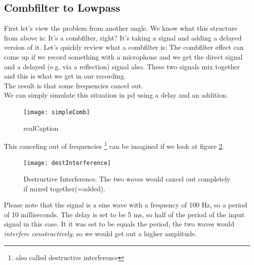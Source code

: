 \subsection{Combfilter to Lowpass}
First let's view the problem from another angle. We know what this structure from above is: It's a combfilter, right? It's taking a signal and adding a delayed version of it. Let's quickly review what a combfilter is:
The combfilter effect can come up if we record something with a microphone and we get the direct signal and a delayed (e.g. via a reflection) signal also. These two signals mix together and this is what we get in our recording.\\
The result is that some frequencies cancel out.\\
We can simply simulate this situation in pd using a delay and an addition.

\begin{figure}[H]
	\centering
	\texttt{[image: simpleComb]}
	\caption[shortCaption]
	{realCaption}
	\label{fig:label}
\end{figure}

This canceling out of frequencies \footnote{also called destructive interference} can be imagined if we look at figure \ref{fig:destIntereference}.
\begin{figure}[H]
	\centering
	\texttt{[image: destInterference]}
	\caption[Destructive Interference]
	{Destructive Interference. The two waves would cancel out completely if mixed together(=added).}
	\label{fig:destIntereference}
\end{figure}

Please note that the signal is a sine wave with a frequency of 100 Hz, so a period of 10 milliseconds. The delay is set to be 5 ms, so half of the period of the input signal in this case. It it was set to be equals the period, the two waves would \textit{interfere constructively}, so we would get out a higher amplitude. \\



